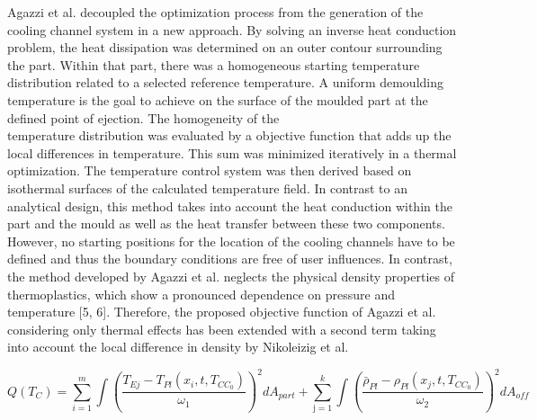 \documentclass[10pt]{article}
\begin{document}
Agazzi et al. decoupled the optimization process from the generation of the cooling channel system in a new approach. By solving an inverse heat conduction problem, the heat dissipation was determined on an outer contour surrounding the part. Within that part, there was a homogeneous starting temperature distribution related to a selected reference temperature. A uniform demoulding temperature is the goal to achieve on the surface of the moulded part at the defined point of ejection. The homogeneity of the\\
temperature distribution was evaluated by a objective function that adds up the local differences in temperature. This sum was minimized iteratively in a thermal optimization. The temperature control system was then derived based on isothermal surfaces of the calculated temperature field. In contrast to an analytical design, this method takes into account the heat conduction within the part and the mould as well as the heat transfer between these two components. However, no starting positions for the location of the cooling channels have to be defined and thus the boundary conditions are free of user influences. In contrast, the method developed by Agazzi et al. neglects the physical density properties of thermoplastics, which show a pronounced dependence on pressure and temperature [5, 6]. Therefore, the proposed objective function of Agazzi et al. considering only thermal effects has been extended with a second term taking into account the local difference in density by Nikoleizig et al.


\begin{equation*}
Q\left(T_{C}\right)=\sum_{i=1}^{m} \int\left(\frac{T_{E j}-T_{P l}\left(x_{i}, t, T_{C C_{0}}\right)}{\omega_{1}}\right)^{2} d A_{p a r t}+\sum_{\mathrm{j}=1}^{k} \int\left(\frac{\bar{\rho}_{P l}-\rho_{P l}\left(x_{j}, t, T_{C C_{0}}\right)}{\omega_{2}}\right)^{2} d A_{o f f} \tag{1}
\end{equation*}
\end{document}
